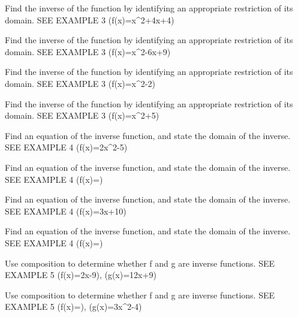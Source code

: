 \documentclass{article}
\newenvironment{practice}[2]{}{}        %
\newcommand{\answer}[1]{}               %
\begin{document}
\begin{practice}{22}{1}
Find the inverse of the function by identifying an appropriate restriction of its domain. SEE EXAMPLE 3
(f(x)=x^2+4x+4)
\answer{See back of book.}
\end{practice}
\begin{practice}{23}{1}
Find the inverse of the function by identifying an appropriate restriction of its domain. SEE EXAMPLE 3
(f(x)=x^2-6x+9)
\answer{See back of book.}
\end{practice}
\begin{practice}{24}{1}
Find the inverse of the function by identifying an appropriate restriction of its domain. SEE EXAMPLE 3
(f(x)=x^2-2)
\answer{See back of book.}
\end{practice}
\begin{practice}{25}{1}
Find the inverse of the function by identifying an appropriate restriction of its domain. SEE EXAMPLE 3
(f(x)=x^2+5)
\answer{See back of book.}
\end{practice}
\begin{practice}{26}{1}
Find an equation of the inverse function, and state the domain of the inverse. SEE EXAMPLE 4
(f(x)=2x^2-5)
\answer{See back of book.}
\end{practice}
\begin{practice}{27}{1}
Find an equation of the inverse function, and state the domain of the inverse. SEE EXAMPLE 4
(f(x)=)
\answer{See back of book.}
\end{practice}
\begin{practice}{28}{1}
Find an equation of the inverse function, and state the domain of the inverse. SEE EXAMPLE 4
(f(x)=3x+10)
\answer{See back of book.}
\end{practice}
\begin{practice}{29}{1}
Find an equation of the inverse function, and state the domain of the inverse. SEE EXAMPLE 4
(f(x)=)
\answer{See back of book.}
\end{practice}
\begin{practice}{30}{1}
Use composition to determine whether f and g are inverse functions. SEE EXAMPLE 5
(f(x)=2x-9), (g(x)=\frac12x+9)
\answer{See back of book.}
\end{practice}
\begin{practice}{31}{1}
Use composition to determine whether f and g are inverse functions. SEE EXAMPLE 5
(f(x)=), (g(x)=3x^2-4)
\answer{See back of book.}
\end{practice}
\end{document}
